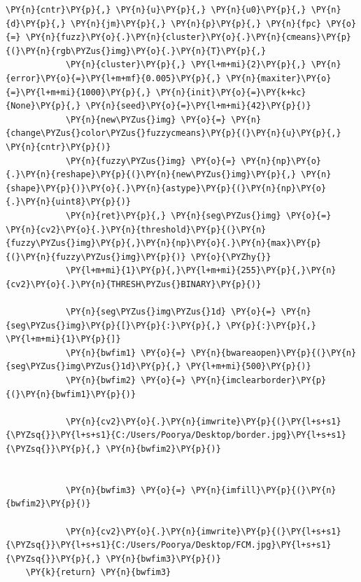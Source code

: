 \begin{tcolorbox}[breakable, size=fbox, boxrule=1pt, pad at break*=1mm,colback=cellbackground, colframe=cellborder]
\begin{Verbatim}[commandchars=\\\{\}]
            \PY{n}{cntr}\PY{p}{,} \PY{n}{u}\PY{p}{,} \PY{n}{u0}\PY{p}{,} \PY{n}{d}\PY{p}{,} \PY{n}{jm}\PY{p}{,} \PY{n}{p}\PY{p}{,} \PY{n}{fpc} \PY{o}{=} \PY{n}{fuzz}\PY{o}{.}\PY{n}{cluster}\PY{o}{.}\PY{n}{cmeans}\PY{p}{(}\PY{n}{rgb\PYZus{}img}\PY{o}{.}\PY{n}{T}\PY{p}{,}
            \PY{n}{cluster}\PY{p}{,} \PY{l+m+mi}{2}\PY{p}{,} \PY{n}{error}\PY{o}{=}\PY{l+m+mf}{0.005}\PY{p}{,} \PY{n}{maxiter}\PY{o}{=}\PY{l+m+mi}{1000}\PY{p}{,} \PY{n}{init}\PY{o}{=}\PY{k+kc}{None}\PY{p}{,} \PY{n}{seed}\PY{o}{=}\PY{l+m+mi}{42}\PY{p}{)}
            \PY{n}{new\PYZus{}img} \PY{o}{=} \PY{n}{change\PYZus{}color\PYZus{}fuzzycmeans}\PY{p}{(}\PY{n}{u}\PY{p}{,} \PY{n}{cntr}\PY{p}{)}
            \PY{n}{fuzzy\PYZus{}img} \PY{o}{=} \PY{n}{np}\PY{o}{.}\PY{n}{reshape}\PY{p}{(}\PY{n}{new\PYZus{}img}\PY{p}{,} \PY{n}{shape}\PY{p}{)}\PY{o}{.}\PY{n}{astype}\PY{p}{(}\PY{n}{np}\PY{o}{.}\PY{n}{uint8}\PY{p}{)}
            \PY{n}{ret}\PY{p}{,} \PY{n}{seg\PYZus{}img} \PY{o}{=} \PY{n}{cv2}\PY{o}{.}\PY{n}{threshold}\PY{p}{(}\PY{n}{fuzzy\PYZus{}img}\PY{p}{,}\PY{n}{np}\PY{o}{.}\PY{n}{max}\PY{p}{(}\PY{n}{fuzzy\PYZus{}img}\PY{p}{)} \PY{o}{\PYZhy{}}
            \PY{l+m+mi}{1}\PY{p}{,}\PY{l+m+mi}{255}\PY{p}{,}\PY{n}{cv2}\PY{o}{.}\PY{n}{THRESH\PYZus{}BINARY}\PY{p}{)}

            \PY{n}{seg\PYZus{}img\PYZus{}1d} \PY{o}{=} \PY{n}{seg\PYZus{}img}\PY{p}{[}\PY{p}{:}\PY{p}{,} \PY{p}{:}\PY{p}{,} \PY{l+m+mi}{1}\PY{p}{]}
            \PY{n}{bwfim1} \PY{o}{=} \PY{n}{bwareaopen}\PY{p}{(}\PY{n}{seg\PYZus{}img\PYZus{}1d}\PY{p}{,} \PY{l+m+mi}{500}\PY{p}{)}
            \PY{n}{bwfim2} \PY{o}{=} \PY{n}{imclearborder}\PY{p}{(}\PY{n}{bwfim1}\PY{p}{)}

            \PY{n}{cv2}\PY{o}{.}\PY{n}{imwrite}\PY{p}{(}\PY{l+s+s1}{\PYZsq{}}\PY{l+s+s1}{C:/Users/Poorya/Desktop/border.jpg}\PY{l+s+s1}{\PYZsq{}}\PY{p}{,} \PY{n}{bwfim2}\PY{p}{)}


            \PY{n}{bwfim3} \PY{o}{=} \PY{n}{imfill}\PY{p}{(}\PY{n}{bwfim2}\PY{p}{)}    

            \PY{n}{cv2}\PY{o}{.}\PY{n}{imwrite}\PY{p}{(}\PY{l+s+s1}{\PYZsq{}}\PY{l+s+s1}{C:/Users/Poorya/Desktop/FCM.jpg}\PY{l+s+s1}{\PYZsq{}}\PY{p}{,} \PY{n}{bwfim3}\PY{p}{)}
    \PY{k}{return} \PY{n}{bwfim3}
	\end{Verbatim}
\end{tcolorbox}

